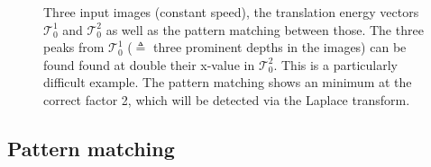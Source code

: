 \documentclass[letterpaper, 10 pt, conference]{ieeeconf}  %
\begin{document}
\begin{figure}[t]
    \caption{Three input images (constant speed), the translation energy vectors $\mathcal{T}_0^1$ and $\mathcal{T}_0^2$ as well as the pattern matching between those. 
    The three peaks from $\mathcal{T}_0^1$ ($\triangleq$ three prominent depths in the images) can be found found at double their x-value in $\mathcal{T}_0^2$. This is a particularly difficult example. The pattern matching shows an minimum at the correct factor 2, which will be detected via the Laplace transform.}
    \label{fig:PatternMatching}
\end{figure}

\subsection{Pattern matching}\label{sec:PM}
\end{document}
